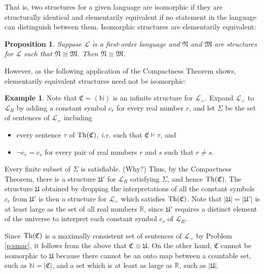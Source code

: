 \documentclass[12pt]{amsbook}
\theoremstyle{plain}
\newtheorem{prop}[thm]{Proposition}
\theoremstyle{definition}
\newtheorem{exmp}{Example}[chapter]
\theoremstyle{remark}
\begin{document}
That is,  two structures for a given language are isomorphic if they are structurally identical and elementarily equivalent if no statement in the language can distinguish between them.  Isomorphic structures are elementarily equivalent:

\begin{prop} \label{p:nine4}
Suppose $\mathcal{L}$ is a first-order language and $\mathfrak{N}$ and $\mathfrak{M}$ are structures for $\mathcal{L}$ such that $\mathfrak{N} \cong \mathfrak{M}$.  Then $\mathfrak{N} \equiv \mathfrak{M}$.
\end{prop}

However,  as the following application of the Compactness Theorem shows,  elementarily equivalent structures need not be isomorphic:

\begin{exmp}
Note that $\mathfrak{C} = (\mathbb{N})$ is an infinite structure for $\mathcal{L}_=$.  Expand $\mathcal{L}_=$ to $\mathcal{L}_R$ by adding a constant symbol $c_r$ for every real number $r$,  and let $\Sigma$ be the set of sentences of $\mathcal{L}_=$ including
\begin{itemize}
\item every sentence $\tau$ of $\text{\rm Th}(\mathfrak{C})$,  {\em i.e.\/} such that $\mathfrak{C} \models \tau$,  and
\item $\lnot c_r = c_s$ for every pair of real numbers $r$ and $s$ such that $r \ne s$.
\end{itemize}
Every finite subset of $\Sigma$ is satisfiable.  (Why?)  Thus,  by the Compactness Theorem,  there is a structure $\mathfrak{U}'$ for $\mathcal{L}_R$ satisfying $\Sigma$,  and hence $\text{\rm Th}(\mathfrak{C})$.  The structure $\mathfrak{U}$ obtained by dropping the interpretations of all the constant symbols $c_r$ from $\mathfrak{U}'$ is then a structure for $\mathcal{L}_=$ which satisfies $\text{\rm Th}(\mathfrak{C})$.  Note that $|\mathfrak{U}| = |\mathfrak{U}'|$ is at least large as the set of all real numbers $\mathbb{R}$,  since $\mathfrak{U}'$ requires a distinct element of the universe to interpret each constant symbol $c_r$ of $\mathcal{L}_R$.

Since $\text{\rm Th}(\mathfrak{C})$ is a maximally consistent set of sentences of $\mathcal{L}_=$ by Problem \ref{p:smac},  it follows from the above that $\mathfrak{C} \equiv \mathfrak{U}$.  On the other hand,  $\mathfrak{C}$ cannot be isomorphic to $\mathfrak{U}$ because there cannot be an onto map between a countable set,  such as $\mathbb{N} = |\mathfrak{C}|$,  and a set which is at least as large as $\mathbb{R}$,  such as $|\mathfrak{U}|$.
\end{exmp}
\end{document}

